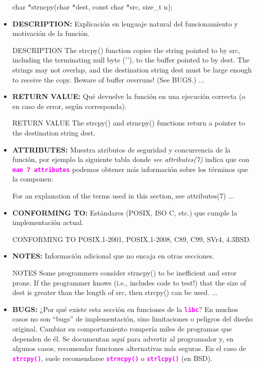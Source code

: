\documentclass[]{scrartcl}
\newcommand{\hl}[1]{\textcolor{magenta}{\textbf{\texttt{#1}}}}
\begin{document}
\begin{itemize}
\begin{bashbox}[]
       char *strncpy(char *dest, const char *src, size_t n);
  \end{bashbox}
  \item \textbf{DESCRIPTION:} Explicación en lenguaje natural del funcionamiento y motivación de la función.
  \begin{bashbox}[]
    DESCRIPTION
      The  strcpy() function copies the string pointed to by src, including
      the terminating null byte ('\0'), to the buffer pointed to by dest.
      The strings may not overlap, and the destination string dest must be
      large enough to receive the copy. Beware of buffer overruns! 
      (See BUGS.)
      ...
  \end{bashbox}
  \item \textbf{RETURN VALUE:} Qué devuelve la función en una ejecución correcta (o en caso de error, según corresponda).
  \begin{bashbox}[]
    RETURN VALUE
       The strcpy() and strncpy() functions return a pointer to the 
       destination string dest.
  \end{bashbox}
  \item \textbf{ATTRIBUTES:} Muestra atributos de seguridad y concurrencia de la función, por ejemplo la siguiente tabla donde \textit{see attributes(7)} indica que con \hl{man 7 attributes} podemos obtener más información sobre los términos que la componen:
  \begin{bashbox}[]
      For an explanation of the terms used in this section, see attributes(7)
      ...
  \end{bashbox} 
  \item \textbf{CONFORMING TO:} Estándares (POSIX, ISO C, etc.) que cumple la implementación actual.
  \begin{bashbox}[]
    CONFORMING TO
       POSIX.1-2001, POSIX.1-2008, C89, C99, SVr4, 4.3BSD.
  \end{bashbox}
  \item \textbf{NOTES:} Información adicional que no encaja en otras secciones.
  \begin{bashbox}[]
    NOTES
       Some  programmers  consider  strncpy() to be inefficient 
       and error prone.  If the programmer knows (i.e., includes 
       code to test!) that the size of dest is greater than the
       length of src, then strcpy() can be used.
        ...
  \end{bashbox}
  \item \textbf{BUGS:} ¿Por qué existe esta sección en funciones de la \hl{libc}? En muchos casos no son “bugs” de implementación, sino limitaciones o peligros del diseño original. Cambiar su comportamiento rompería miles de programas que dependen de él. Se documentan aquí para advertir al programador y, en algunos casos, recomendar funciones alternativas más seguras. En el caso de \hl{strcpy()}, suele recomendarse \hl{strncpy()} o \hl{strlcpy()} (en BSD).

\end{itemize}
\end{document}
